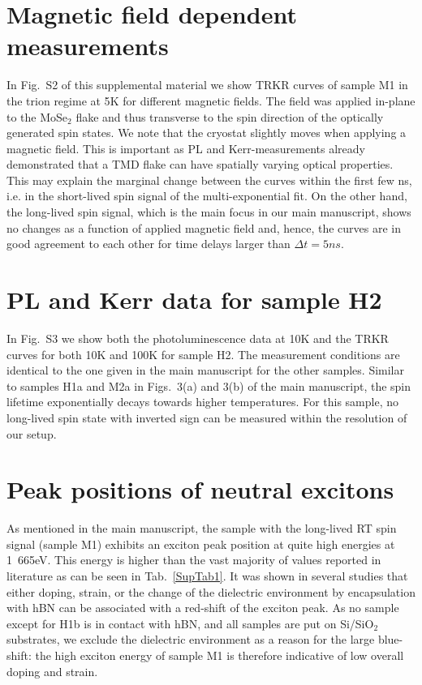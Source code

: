 \documentclass[prb,aps,superscriptaddress,reprint,floatfix]{revtex4-1}
\begin{document}
\section{Magnetic field dependent measurements}
In Fig.~S2 of this supplemental material we show TRKR curves of sample M1 in the trion regime at \unit{5}{K} for different magnetic fields. The field was applied in-plane to the MoSe$_2$ flake and thus transverse to the spin direction of the optically generated spin states. We note that the cryostat slightly moves when applying a magnetic field. This is important as PL and Kerr-measurements already demonstrated that a TMD flake can have spatially varying optical properties.\cite{arXiv160203568B} This may explain the marginal change between the curves within the first few ns, i.e. in the short-lived spin signal of the multi-exponential fit. On the other hand, the long-lived spin signal, which is the main focus in our main manuscript, shows no changes as a function of applied magnetic field and, hence, the curves are in good agreement to each other for time delays larger than $\Delta t = \unit{5}{ns}$.


\section{PL and Kerr data for sample H2}
In Fig.~S3 we show both the photoluminescence data at \unit{10}{K} and the TRKR curves for both \unit{10}{K} and \unit{100}{K} for sample H2. The measurement conditions are identical to the one given in the main manuscript for the other samples. Similar to samples H1a and M2a in Figs.~3(a) and 3(b) of the main manuscript, the spin lifetime exponentially decays towards higher temperatures. For this sample, no long-lived spin state with inverted sign can be measured within the resolution of our setup.

\section{Peak positions of neutral excitons}

As mentioned in the main manuscript, the sample with the long-lived RT spin signal (sample M1) exhibits an exciton peak position at quite high energies at \unit{1.665}{eV}. This energy is higher than the vast majority of values reported in literature as can be seen in Tab.~\ref{SupTab1}. It was shown in several studies that either doping,\cite{NatureNanotechnology.12.856,NaturePhysics.13.255,NatNano.8.634} strain,\cite{Nanoscale.8.2589,PRB.88.121301,NanoLetters.13.3626} or the change of the dielectric environment by encapsulation with hBN\cite{ScientificReports.7.12383, 2DMaterials.4.031011} can be associated with a red-shift of the exciton peak. As no sample except for H1b is in contact with hBN, and all samples are put on Si/SiO$_2$ substrates, we exclude the dielectric environment as a reason for the large blue-shift: the high exciton energy of sample M1 is therefore indicative of low overall doping and strain.
\end{document}
